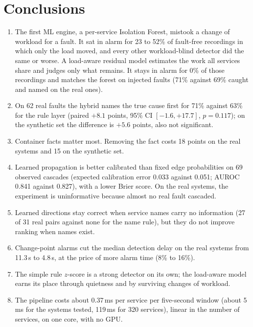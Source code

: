 \section{Conclusions}
\begin{enumerate}
\item The first ML engine, a per-service Isolation Forest, mistook a change of workload for a fault. It sat in alarm for 23 to 52\% of fault-free recordings in which only the load moved, and every other workload-blind detector did the same or worse. A load-aware residual model estimates the work all services share and judges only what remains. It stays in alarm for 0\% of those recordings and matches the forest on injected faults (71\% against 69\% caught and named on the real ones).
\item On 62 real faults the hybrid names the true cause first for 71\% against 63\% for the rule layer (paired $+8.1$ points, 95\% CI $[-1.6,+17.7]$, $p=0.117$); on the synthetic set the difference is $+5.6$ points, also not significant.
\item Container facts matter most. Removing the  fact costs 18 points on the real systems and 15 on the synthetic set.
\item Learned propagation is better calibrated than fixed edge probabilities on 69 observed cascades (expected calibration error 0.033 against 0.051; AUROC 0.841 against 0.827), with a lower Brier score. On the real systems, the experiment is uninformative because almost no real fault cascaded.
\item Learned directions stay correct when service names carry no information (27 of 31 real pairs against none for the name rule), but they do not improve ranking when names exist.
\item Change-point alarms cut the median detection delay on the real systems from 11.3\,s to 4.8\,s, at the price of more alarm time (8\% to 16\%).
\item The simple rule $z$-score is a strong detector on its own; the load-aware model earns its place through quietness and by surviving changes of workload.
\item The pipeline costs about 0.37\,ms per service per five-second window (about 5\,ms for the systems tested, 119\,ms for 320 services), linear in the number of services, on one core, with no GPU.
\end{enumerate}

